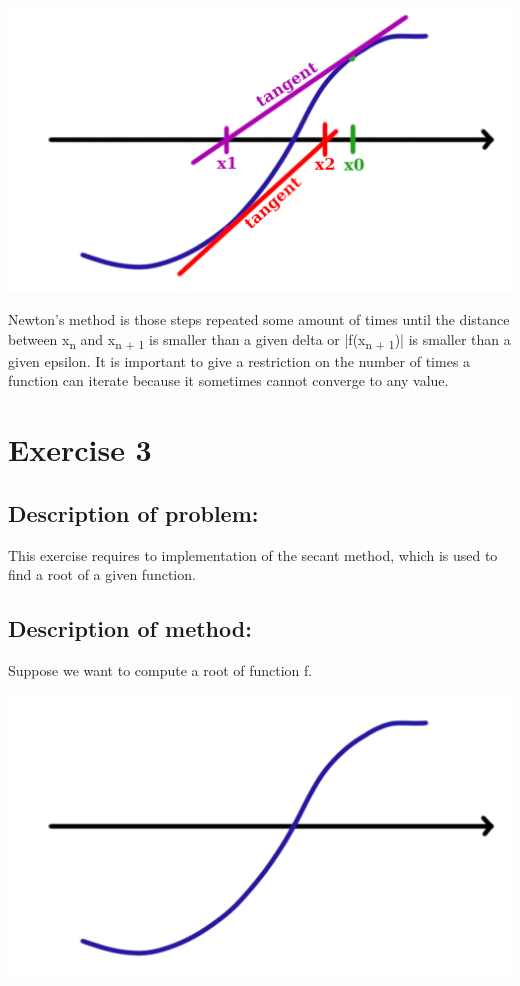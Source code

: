 \documentclass{article}
\begin{document}
\begin{center}
    \includegraphics[scale=0.4]{newton3}
\end{center}

Newton's method is those steps repeated some amount of times until the distance between x\textsubscript{n} and x\textsubscript{n + 1} is smaller than a given delta or |f(x\textsubscript{n + 1})| is smaller than a given epsilon. It is important to give a restriction on the number of times a function can iterate because it sometimes cannot converge to any value.

\section*{Exercise 3}
\subsection*{Description of problem:}
This exercise requires to implementation of the secant method, which is used to find a root of a given function.

\subsection*{Description of method:}
Suppose we want to compute a root of function f.

\begin{center}
    \includegraphics[scale=0.3]{newton1}
\end{center}
\end{document}
